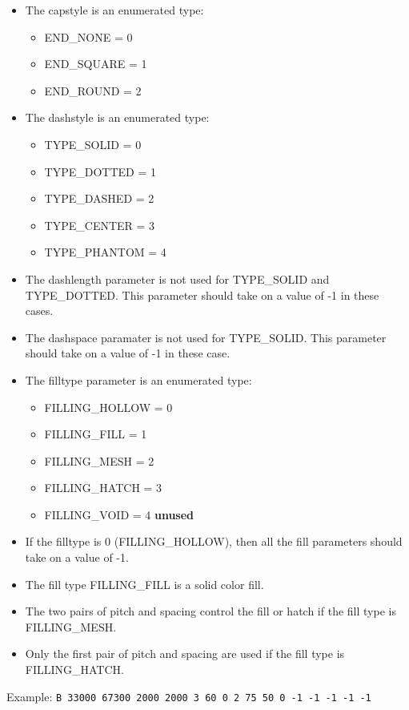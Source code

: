 \documentclass{article}
\begin{document}
\begin{itemize}
\item The capstyle is an enumerated type: 
\begin{itemize}
	\item END\_NONE = 0
	\item END\_SQUARE = 1
	\item END\_ROUND = 2
\end{itemize}
\item The dashstyle is an enumerated type: 
\begin{itemize}
	\item TYPE\_SOLID = 0 
	\item TYPE\_DOTTED = 1
	\item TYPE\_DASHED = 2
	\item TYPE\_CENTER = 3
        \item TYPE\_PHANTOM = 4
\end{itemize}
\item The dashlength parameter is not used for TYPE\_SOLID and TYPE\_DOTTED.  
      This parameter should take on a value of -1 in these cases.
\item The dashspace paramater is not used for TYPE\_SOLID.
      This parameter should take on a value of -1 in these case.
\item The filltype parameter is an enumerated type: 
\begin{itemize}
	\item FILLING\_HOLLOW = 0
	\item FILLING\_FILL = 1
	\item FILLING\_MESH = 2 
	\item FILLING\_HATCH = 3
        \item FILLING\_VOID = 4  {\bf unused}
\end{itemize}
\item If the filltype is 0 (FILLING\_HOLLOW), then all the fill parameters 
      should take on a value of -1.
\item The fill type FILLING\_FILL is a solid color fill.
\item The two pairs of pitch and spacing control the fill or hatch if the
      fill type is FILLING\_MESH. 
\item Only the first pair of pitch and spacing are used if the fill type is
      FILLING\_HATCH.
\end{itemize}

Example:\newline
{\tt B 33000 67300 2000 2000 3 60 0 2 75 50 0 -1 -1 -1 -1 -1}
\end{document}
